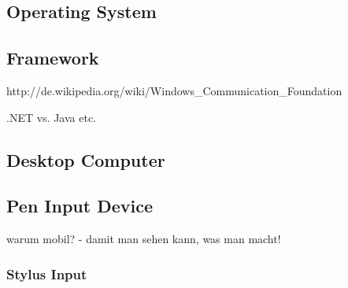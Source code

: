 \subsection{Operating System}
\label{sec:operatingsystem}

\subsection{Framework}
\label{sec:framework}

http://de.wikipedia.org/wiki/Windows_Communication_Foundation

.NET vs. Java etc.

\subsection{Desktop Computer}
\label{sec:desktopcomputer}

\subsection{Pen Input Device}
\label{sec:peninputdevice}

warum mobil? - damit man sehen kann, was man macht!

\subsubsection{Stylus Input}
\label{sec:stylusinput}

